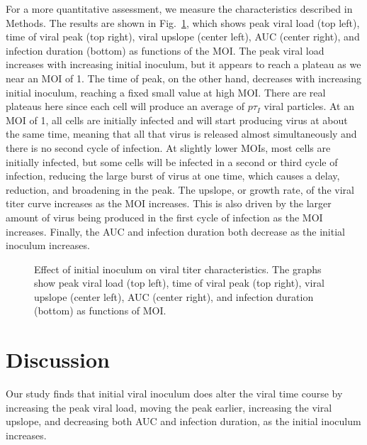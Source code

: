 For a more quantitative assessment, we measure the characteristics described in Methods. The results are shown in Fig.\ \ref{results}, which shows peak viral load (top left), time of viral peak (top right), viral upslope (center left), AUC (center right), and infection duration (bottom) as functions of the MOI. The peak viral load increases with increasing initial inoculum, but it appears to reach a plateau as we near an MOI of 1. The time of peak, on the other hand, decreases with increasing initial inoculum, reaching a fixed small value at high MOI. There are real plateaus here since each cell will produce an average of $p\tau_I$ viral particles. At an MOI of 1, all cells are initially infected and will start producing virus at about the same time, meaning that all that virus is released almost simultaneously and there is no second cycle of infection. At slightly lower MOIs, most cells are initially infected, but some cells will be infected in a second or third cycle of infection, reducing the large burst of virus at one time, which causes a delay, reduction, and broadening in the peak. The upslope, or growth rate, of the viral titer curve increases as the MOI increases. This is also driven by the larger amount of virus being produced in the first cycle of infection as the MOI increases. Finally, the AUC and infection duration both decrease as the initial inoculum increases.  
\begin{figure}[!h]
\begin{center}
\caption{Effect of initial inoculum on viral titer characteristics. The graphs show peak viral load (top left), time of viral peak (top right), viral upslope (center left), AUC (center right), and infection duration (bottom) as functions of MOI. \label{results}}
\end{center}
\end{figure}

\section{Discussion}

Our study finds that initial viral inoculum does alter the viral time course by increasing the peak viral load, moving the peak earlier, increasing the viral upslope, and decreasing both AUC and infection duration, as the initial inoculum increases. 



